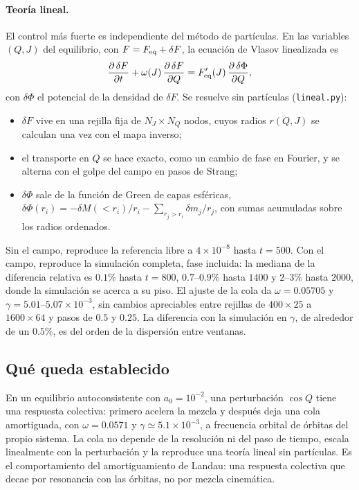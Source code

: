 \documentclass[11pt,a4paper]{article}
\newcommand{\Jr}{J}
\newcommand{\Qr}{Q}
\theoremstyle{definition}
\begin{document}
\paragraph{Teoría lineal.} El control más fuerte es independiente del método de
partículas. En las variables $(\Qr,\Jr)$ del equilibrio, con $F=F_{\rm eq}+\delta F$, la
ecuación de Vlasov linealizada es
\begin{equation}
  \frac{\partial\,\delta F}{\partial t} + \omega(\Jr)\,\frac{\partial\,\delta F}{\partial\Qr}
  = F_{\rm eq}'(\Jr)\,\frac{\partial\,\delta\Phi}{\partial\Qr},
\end{equation}
con $\delta\Phi$ el potencial de la densidad de $\delta F$. Se resuelve sin partículas
(\texttt{lineal.py}):
\begin{itemize}
  \item $\delta F$ vive en una rejilla fija de $N_J\times N_Q$ nodos, cuyos radios
    $r(\Qr,\Jr)$ se calculan una vez con el mapa inverso;
  \item el transporte en $\Qr$ se hace exacto, como un cambio de fase en Fourier, y se
    alterna con el golpe del campo en pasos de Strang;
  \item $\delta\Phi$ sale de la función de Green de capas esféricas,
    $\delta\Phi(r_i)=-\delta M(<r_i)/r_i-\sum_{r_j>r_i}\delta m_j/r_j$, con sumas
    acumuladas sobre los radios ordenados.
\end{itemize}
Sin el campo, reproduce la referencia libre a $4\times10^{-8}$ hasta $t=500$. Con el
campo, reproduce la simulación completa, fase incluida: la mediana de la diferencia
relativa es $0.1\%$ hasta $t=800$, $0.7$--$0.9\%$ hasta $1400$ y $2$--$3\%$ hasta
$2000$, donde la simulación se acerca a su piso. El ajuste de la cola da
$\omega=0.05705$ y $\gamma=5.01$--$5.07\times10^{-3}$, sin cambios apreciables entre
rejillas de $400\times25$ a $1600\times64$ y pasos de $0.5$ y $0.25$. La diferencia con
la simulación en $\gamma$, de alrededor de un $0.5\%$, es del orden de la dispersión entre
ventanas.

\subsection{Qué queda establecido}

En un equilibrio autoconsistente con $a_0=10^{-2}$, una perturbación $\cos\Qr$ tiene una
respuesta colectiva: primero acelera la mezcla y después deja una cola amortiguada, con
$\omega=0.0571$ y $\gamma\simeq5.1\times10^{-3}$, a frecuencia orbital de órbitas del
propio sistema. La cola no depende de la resolución ni del paso de tiempo, escala
linealmente con la perturbación y la reproduce una teoría lineal sin partículas. Es el
comportamiento del amortiguamiento de Landau: una respuesta colectiva que decae por
resonancia con las órbitas, no por mezcla cinemática.
\end{document}
